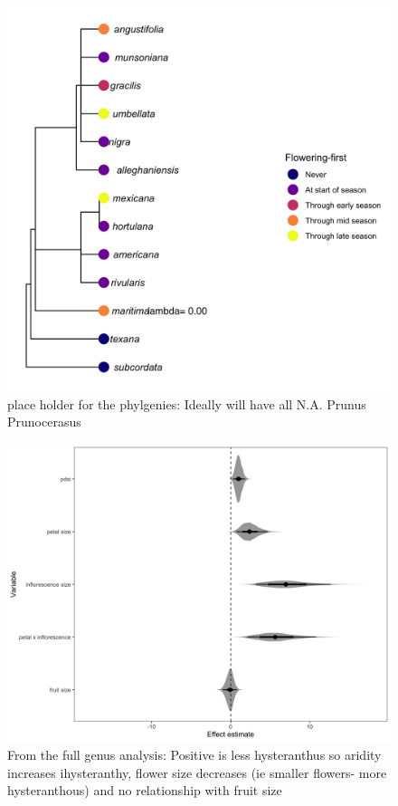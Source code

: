 \documentclass{article}\usepackage[]{graphicx}\usepackage[]{color}
\begin{document}
\begin{figure}[h!]
    \centering
 \includegraphics[width=\textwidth]{..//..//Plots/phylosig2.jpeg}
    \caption{place holder for the phylgenies: Ideally will have all N.A. Prunus  Prunocerasus }
    \label{fig:phylo2}
\end{figure}

\begin{figure}[h!]
    \centering
 \includegraphics[width=\textwidth]{..//..//Plots/fullprunus_mus.jpeg}
    \caption{From the full genus analysis: Positive is less hysteranthus so aridity increases ihysteranthy, flower size decreases (ie smaller flowers- more hysteranthous) and no relationship with fruit size }
    \label{fig:cherries}
\end{figure}
\end{document}
